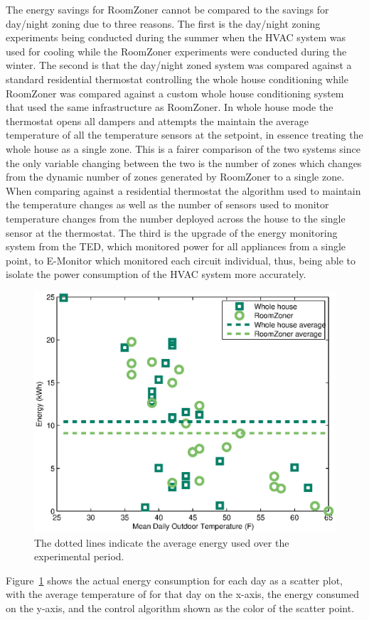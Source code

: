 The energy savings for RoomZoner cannot be compared to the savings for day/night
zoning due to three reasons. The first is the day/night zoning experiments being
conducted during the summer when the HVAC system was used for cooling while the
RoomZoner experiments were conducted during the winter. The second is that the
day/night zoned system was compared against a standard residential thermostat
controlling the whole house conditioning while RoomZoner was compared against a
custom whole house conditioning system that used the same infrastructure as
RoomZoner. In whole house mode the thermostat opens all dampers and attempts the
maintain the average temperature of all the temperature sensors at the setpoint,
in essence treating the whole house as a single zone. This is a fairer
comparison of the two systems since the only variable changing between the two
is the number of zones which changes from the dynamic number of zones generated
by RoomZoner to a single zone. When comparing against a residential thermostat
the algorithm used to maintain the temperature changes as well as the number of
sensors used to monitor temperature changes from the number deployed across the
house to the single sensor at the thermostat. The third is the upgrade of the
energy monitoring system from the TED, which monitored power for all appliances
from a single point, to E-Monitor which monitored each circuit individual, thus,
being able to isolate the power consumption of the HVAC system more accurately.

\begin{figure}[!htb]
  \centering
  \includegraphics[width=0.6\columnwidth]{fig/cs2scatter.eps}
  \caption[Effect of outdoor temperature on energy usage for RoomZoner]{The
  dotted lines indicate the average energy used over the experimental period.}
  \label{fig:cs2energy}
\end{figure}

Figure~\ref{fig:cs2energy} shows the actual energy consumption for each day as a
scatter plot, with the average temperature of for that day on the x-axis, the
energy consumed on the y-axis, and the control algorithm shown as the color of
the scatter point. 

